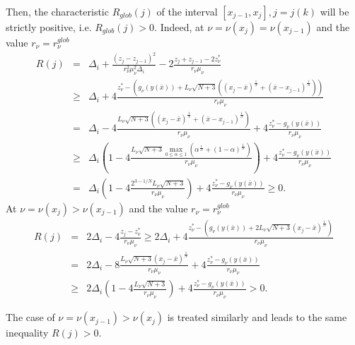 \documentclass[preprint]{elsarticle}
\begin{document}
	Then, the characteristic $R_{glob}(j)$ of the interval $[x_{j-1}, x_j], j=j(k)$ will be strictly positive, i.e. $R_{glob}(j)>0$. Indeed, at $\nu=\nu(x_j)=\nu(x_{j-1})$ and the value $r_{\nu}=r_{\nu}^{glob}$
\begin{eqnarray}
	R(j) &=& \Delta_i + \frac{(z_j-z_{j-1})^2}{r_{\nu}^2\mu_{\nu}^2\Delta_i} - 2\frac{z_j+z_{j-1}-2z_{\nu}^*}{r_{\nu}\mu_{\nu}}  \nonumber \\
	&\geq& \Delta_i + 4\frac{z_{\nu}^*-\left( g_{\nu}\left( y(\bar x) \right)+L_{\nu}\sqrt{N+3}\left( (x_j-\bar x)^{\frac{1}{N}}+(\bar x - x_{j-1})^{\frac{1}{N}} \right)\right)}{r_{\nu}\mu_{\nu}} \nonumber \\
	&=& \Delta_i-4\frac{L_{\nu}\sqrt{N+3}\left( (x_j-\bar x)^{\frac{1}{N}}+(\bar x - x_{j-1})^{\frac{1}{N}} \right)}{r_{\nu}\mu_{\nu}}+4\frac{z_{\nu}^*-g_{\nu}\left( y(\bar x) \right)}{r_{\nu}\mu_{\nu}} \nonumber \\
	&\geq& \Delta_i\left(1-4\frac{L_{\nu}\sqrt{N+3}\max_{0\leq\alpha\leq1} {\left( \alpha^{\frac{1}{N}}+(1-\alpha)^{\frac{1}{N}} \right)}}{r_{\nu}\mu_{\nu}} \right)+4\frac{z_{\nu}^*-g_{\nu}\left( y(\bar x) \right)}{r_{\nu}\mu_{\nu}} \nonumber \\
	&=& \Delta_i\left(1-4\frac{2^{3-1/N}L_{\nu}\sqrt{N+3}}{r_{\nu}\mu_{\nu}} \right)+4\frac{z_{\nu}^*-g_{\nu}\left( y(\bar x) \right)}{r_{\nu}\mu_{\nu}} \geq 0.
	\nonumber
\end{eqnarray}
At $\nu=\nu(x_j ) > \nu(x_{j-1})$ and the value $r_{\nu}=r_{\nu}^{glob}$
\begin{eqnarray}
	R(j) &=& 2\Delta_i - 4\frac{z_j-z_{\nu}^*}{r_{\nu}\mu_{\nu}} \geq 2\Delta_i+4\frac{z_{\nu}^*-\left( g_{\nu}\left(y(\bar x)\right)+2L_{\nu}\sqrt{N+3}(x_j-\bar x)^{\frac{1}{N}} \right)}{r_{\nu}\mu_{\nu}} \nonumber \\
	&=& 2\Delta_i - 8\frac{L_{\nu}\sqrt{N+3}(x_j-\bar x)^{\frac{1}{N}}}{r_{\nu}\mu_{\nu}}+4\frac{z_{\nu}^*-g_{\nu}\left( y(\bar x) \right)}{r_{\nu}\mu_{\nu}} \nonumber \\
	&\geq& 2\Delta_i\left( 1-4\frac{L_{\nu}\sqrt{N+3}}{r_{\nu}\mu_{\nu}} \right) + 4\frac{z_{\nu}^*-g_{\nu}\left( y(\bar x) \right)}{r_{\nu}\mu_{\nu}} > 0.
	\nonumber
\end{eqnarray}

	The case of $\nu=\nu(x_{j-1})>\nu(x_j)$ is treated similarly and leads to the same inequality $R(j)>0$.
\end{document}
